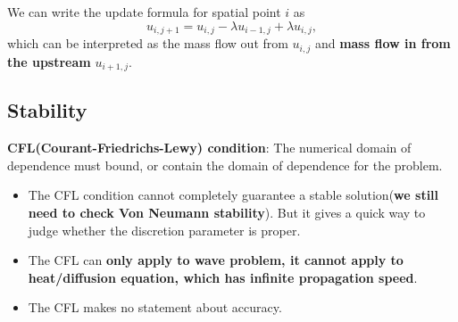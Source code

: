 \begin{refsection}
\begin{remark}
We can write the update formula for spatial point $i$ as
$$u_{i,j+1} = u_{i,j} - \lambda u_{i-1,j} + \lambda u_{i,j},$$
which can be interpreted as the mass flow out from $u_{i,j}$ and \textbf{mass flow in from the upstream} $u_{i+1,j}$.
\end{remark}


\subsection{Stability}



\begin{definition}
\cite[134]{holmes2007introduction}
\textbf{CFL(Courant-Friedrichs-Lewy) condition}: The numerical domain of dependence must bound, or contain the domain of dependence for the problem. 
\end{definition}

\begin{remark}\hfill
\begin{itemize}
    \item The CFL condition cannot completely guarantee a stable solution(\textbf{we still need to check Von Neumann stability}). But it gives a quick way to judge whether the discretion parameter is proper.
    \item The CFL can \textbf{only apply to wave problem, it cannot apply to heat/diffusion equation, which has infinite propagation speed}.
    \item The CFL makes no statement about accuracy.
\end{itemize}
\end{remark}




\end{refsection}
